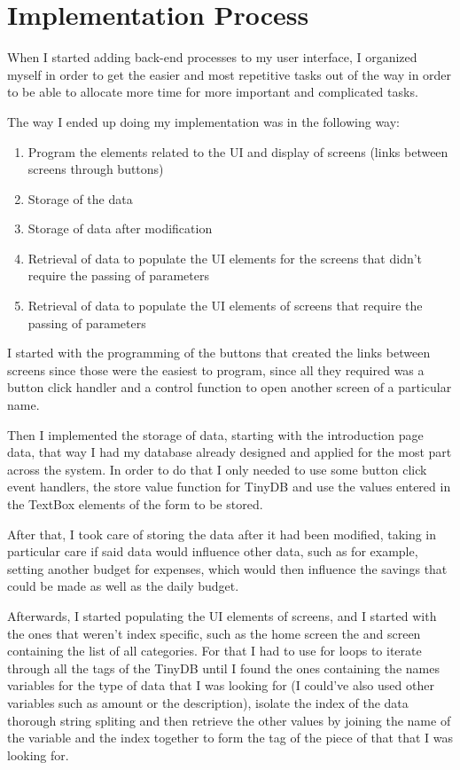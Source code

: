 \chapter{Implementation Process}
When I started adding back-end processes to my user interface, I organized myself in order to get the easier and most repetitive tasks out of the way in order to be able to allocate more time for more important and complicated tasks.

The way I ended up doing my implementation was in the following way:
\begin{enumerate}
  \item Program the elements related to the UI and display of screens (links between screens through buttons)
  \item Storage of the data
  \item Storage of data after modification
  \item Retrieval of data to populate the UI elements for the screens that didn't require the passing of parameters
  \item Retrieval of data to populate the UI elements of screens that require the passing of parameters
\end{enumerate}

I started with the programming of the buttons that created the links between screens since those were the easiest to program, since all they required was a button click handler and a control function to open another screen of a particular name.

Then I implemented the storage of data, starting with the introduction page data, that way I had my database already designed and applied for the most part across the system. In order to do that I only needed to use some button click event handlers, the store value function for TinyDB and use the values entered in the TextBox elements of the form to be stored.

After that, I took care of storing the data after it had been modified, taking in particular care if said data would influence other data, such as for example, setting another budget for expenses, which would then influence the savings that could be made as well as the daily budget.

Afterwards, I started populating the UI elements of screens, and I started with the ones that weren't index specific, such as the home screen the and screen containing the list of all categories. For that I had to use for loops to iterate through all the tags of the TinyDB until I found the ones containing the names variables for the type of data that I was looking for (I could've also used other variables such as amount or the description), isolate the index of the data thorough string spliting and then retrieve the other values by joining the name of the variable and the index together to form the tag of the piece of that that I was looking for.

